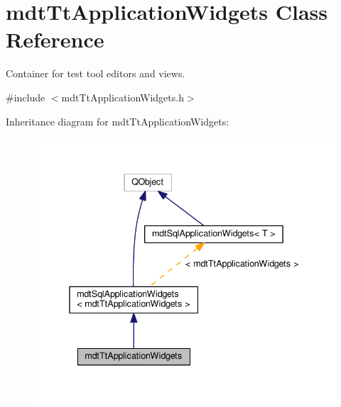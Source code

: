\hypertarget{classmdt_tt_application_widgets}{\section{mdt\-Tt\-Application\-Widgets Class Reference}
\label{classmdt_tt_application_widgets}
}


Container for test tool editors and views.  




{\ttfamily \#include $<$mdt\-Tt\-Application\-Widgets.\-h$>$}



Inheritance diagram for mdt\-Tt\-Application\-Widgets\-:
\nopagebreak
\begin{figure}[H]
\begin{center}
\leavevmode
\includegraphics[width=338pt]{classmdt_tt_application_widgets__inherit__graph}
\end{center}
\end{figure}


